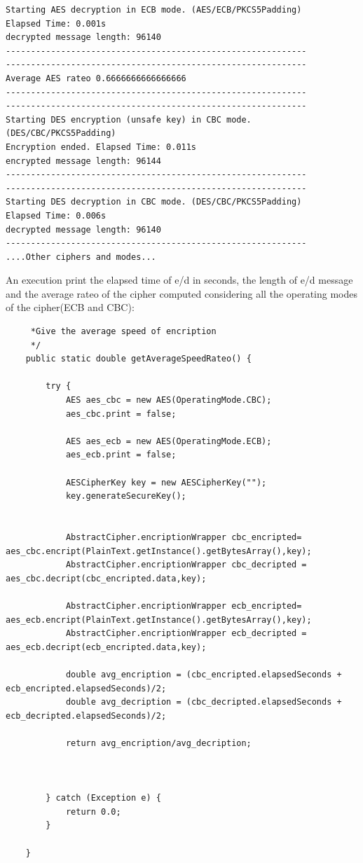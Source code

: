 \documentclass{article}
\begin{document}
\begin{verbatim}
Starting AES decryption in ECB mode. (AES/ECB/PKCS5Padding)
Elapsed Time: 0.001s
decrypted message length: 96140
------------------------------------------------------------
------------------------------------------------------------
Average AES rateo 0.6666666666666666
------------------------------------------------------------
------------------------------------------------------------
Starting DES encryption (unsafe key) in CBC mode. (DES/CBC/PKCS5Padding)
Encryption ended. Elapsed Time: 0.011s
encrypted message length: 96144
------------------------------------------------------------
------------------------------------------------------------
Starting DES decryption in CBC mode. (DES/CBC/PKCS5Padding)
Elapsed Time: 0.006s
decrypted message length: 96140
------------------------------------------------------------
....Other ciphers and modes...
	\end{verbatim}

An execution print the elapsed time of e/d in seconds, the length of e/d message and the average rateo of the cipher computed considering all the operating modes of the cipher(ECB and CBC):
	
	\begin{verbatim}
	 *Give the average speed of encription 
	 */
	public static double getAverageSpeedRateo() {

		try {
			AES aes_cbc = new AES(OperatingMode.CBC);
			aes_cbc.print = false;

			AES aes_ecb = new AES(OperatingMode.ECB);
			aes_ecb.print = false;

			AESCipherKey key = new AESCipherKey("");
			key.generateSecureKey();


			AbstractCipher.encriptionWrapper cbc_encripted= aes_cbc.encript(PlainText.getInstance().getBytesArray(),key);
			AbstractCipher.encriptionWrapper cbc_decripted = aes_cbc.decript(cbc_encripted.data,key);

			AbstractCipher.encriptionWrapper ecb_encripted= aes_ecb.encript(PlainText.getInstance().getBytesArray(),key);
			AbstractCipher.encriptionWrapper ecb_decripted = aes_ecb.decript(ecb_encripted.data,key);

			double avg_encription = (cbc_encripted.elapsedSeconds + ecb_encripted.elapsedSeconds)/2;
			double avg_decription = (cbc_decripted.elapsedSeconds + ecb_decripted.elapsedSeconds)/2;

			return avg_encription/avg_decription;



		} catch (Exception e) {
			return 0.0;
		}

	}
	\end{verbatim}
\end{document}
